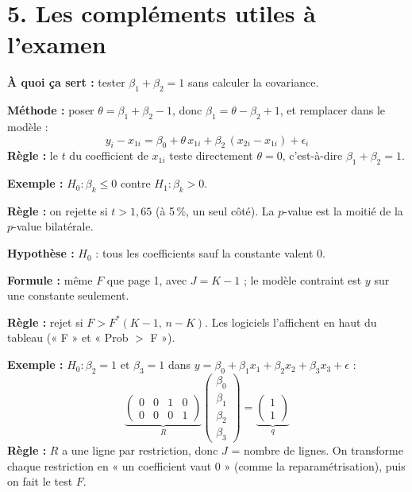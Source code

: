 \documentclass[12pt,a4paper]{article}
\begin{document}
\section*{5. Les compléments utiles à l'examen}

\begin{outil}[title={Reparamétrisation : faire le test d'une somme avec un simple $t$}]
\textbf{À quoi ça sert :} tester $\beta_1+\beta_2=1$ sans calculer la covariance.

\textbf{Méthode :} poser $\theta=\beta_1+\beta_2-1$, donc $\beta_1=\theta-\beta_2+1$, et remplacer dans le modèle :
\[
y_i-x_{1i}=\beta_0+\theta\,x_{1i}+\beta_2\,(x_{2i}-x_{1i})+\epsilon_i
\]
\textbf{Règle :} le $t$ du coefficient de $x_{1i}$ teste directement $\theta=0$, c'est-à-dire $\beta_1+\beta_2=1$.
\end{outil}

\begin{outil}[title={Test unilatéral : quand l'alternative a un seul sens}]
\textbf{Exemple :} $H_0:\beta_k\le0$ contre $H_1:\beta_k>0$.

\textbf{Règle :} on rejette si $t>1{,}65$ (à 5\,\%, un seul côté). La $p$-value est la moitié de la $p$-value bilatérale.
\end{outil}

\begin{outil}[title={Test $F$ : toutes les pentes sont-elles nulles ?}]
\textbf{Hypothèse :} $H_0$ : tous les coefficients sauf la constante valent 0.

\textbf{Formule :} même $F$ que page 1, avec $J=K-1$ ; le modèle contraint est $y$ sur une constante seulement.

\textbf{Règle :} rejet si $F>F^*(K-1,\,n-K)$. Les logiciels l'affichent en haut du tableau (« F » et « Prob $>$ F »).
\end{outil}

\begin{outil}[title={Écrire plusieurs restrictions sous la forme $R\beta=q$}]
\textbf{Exemple :} $H_0:\beta_2=1$ et $\beta_3=1$ dans $y=\beta_0+\beta_1x_1+\beta_2x_2+\beta_3x_3+\epsilon$ :
\[
\underbrace{\begin{pmatrix}0&0&1&0\\0&0&0&1\end{pmatrix}}_{R}\begin{pmatrix}\beta_0\\\beta_1\\\beta_2\\\beta_3\end{pmatrix}=\underbrace{\begin{pmatrix}1\\1\end{pmatrix}}_{q}
\]
\textbf{Règle :} $R$ a une ligne par restriction, donc $J$ = nombre de lignes. On transforme chaque restriction en « un coefficient vaut 0 » (comme la reparamétrisation), puis on fait le test $F$.
\end{outil}
\end{document}
